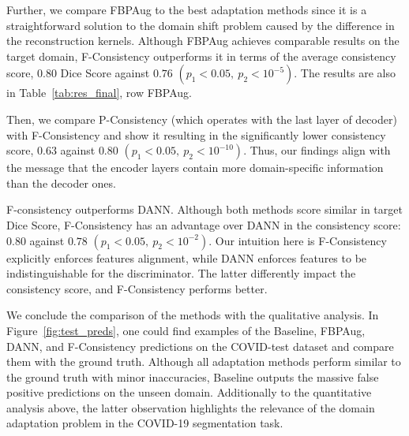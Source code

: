 

Further, we compare FBPAug to the best adaptation methods since it is a straightforward solution to the domain shift problem caused by the difference in the reconstruction kernels. Although FBPAug achieves comparable results on the target domain, F-Consistency outperforms it in terms of the average consistency score, $0.80$ Dice Score against $0.76$ $\left(p_1 < 0.05,\: p_2 < 10^{-5}\right)$. The results are also in Table~\ref{tab:res_final}, row FBPAug.

Then, we compare P-Consistency (which operates with the last layer of decoder) with F-Consistency and show it resulting in the significantly lower consistency score, $0.63$ against $0.80$ $\left(p_1 < 0.05,\: p_2 < 10^{-10}\right)$. Thus, our findings align with the message \cite{zakazov2021anatomy} that the encoder layers contain more domain-specific information than the decoder ones.

F-consistency outperforms DANN. Although both methods score similar in target Dice Score, F-Consistency has an advantage over DANN in the consistency score: $0.80$ against $0.78$ $\left(p_1 < 0.05,\: p_2 < 10^{-2}\right)$. Our intuition here is F-Consistency explicitly enforces features alignment, while DANN enforces features to be indistinguishable for the discriminator. The latter differently impact the consistency score, and F-Consistency performs better.

We conclude the comparison of the methods with the qualitative analysis. In Figure~\ref{fig:test_preds}, one could find examples of the Baseline, FBPAug, DANN, and F-Consistency predictions on the COVID-test dataset and compare them with the ground truth. Although all adaptation methods perform similar to the ground truth with minor inaccuracies, Baseline outputs the massive false positive predictions on the unseen domain. Additionally to the quantitative analysis above, the latter observation highlights the relevance of the domain adaptation problem in the COVID-19 segmentation task.

